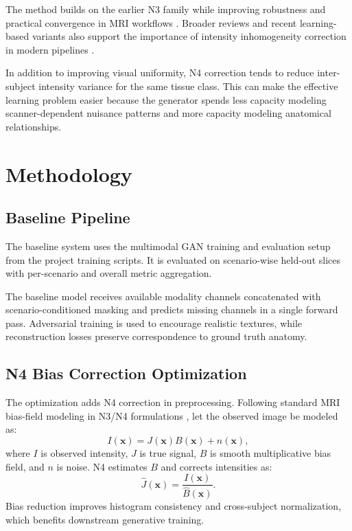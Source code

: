 \documentclass[conference]{IEEEtran}
\begin{document}
The method builds on the earlier N3 family while improving robustness and practical convergence in MRI workflows \cite{tustison2010n4,sled1998}. Broader reviews and recent learning-based variants also support the importance of intensity inhomogeneity correction in modern pipelines \cite{vovk2007,kanakaraj2024,dovrou2023}.

In addition to improving visual uniformity, N4 correction tends to reduce inter-subject intensity variance for the same tissue class. This can make the effective learning problem easier because the generator spends less capacity modeling scanner-dependent nuisance patterns and more capacity modeling anatomical relationships.

\section{Methodology}
\subsection{Baseline Pipeline}
The baseline system uses the multimodal GAN training and evaluation setup from the project training scripts. It is evaluated on scenario-wise held-out slices with per-scenario and overall metric aggregation.

The baseline model receives available modality channels concatenated with scenario-conditioned masking and predicts missing channels in a single forward pass. Adversarial training is used to encourage realistic textures, while reconstruction losses preserve correspondence to ground truth anatomy.

\subsection{N4 Bias Correction Optimization}
The optimization adds N4 correction in preprocessing. Following standard MRI bias-field modeling in N3/N4 formulations \cite{tustison2010n4,sled1998}, let the observed image be modeled as:
\begin{equation}
I(\mathbf{x}) = J(\mathbf{x})B(\mathbf{x}) + n(\mathbf{x}),
\end{equation}
where $I$ is observed intensity, $J$ is true signal, $B$ is smooth multiplicative bias field, and $n$ is noise. N4 estimates $B$ and corrects intensities as:
\begin{equation}
\hat{J}(\mathbf{x}) = \frac{I(\mathbf{x})}{\hat{B}(\mathbf{x})}.
\end{equation}
Bias reduction improves histogram consistency and cross-subject normalization, which benefits downstream generative training.
\end{document}
